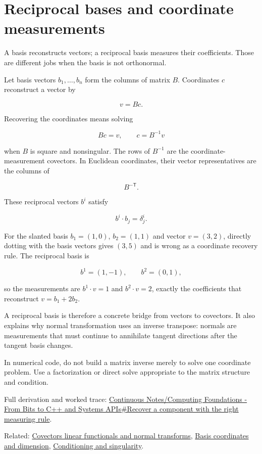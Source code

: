 \hypertarget{appendix-6b3d696dd902}{}
\section{Reciprocal bases and coordinate measurements}\label{appendix-6b3d696dd902-reciprocal-bases-and-coordinate-measurements}

A basis reconstructs vectors; a reciprocal basis measures their coefficients. Those are different jobs when the basis is not orthonormal.

Let basis vectors \(b_1,\ldots,b_n\) form the columns of matrix \(B\). Coordinates \(c\) reconstruct a vector by

\[
v=Bc.
\]

Recovering the coordinates means solving

\[
Bc=v,
\qquad c=B^{-1}v
\]

when \(B\) is square and nonsingular. The rows of \(B^{-1}\) are the coordinate-measurement covectors. In Euclidean coordinates, their vector representatives are the columns of

\[
B^{-\mathsf T}.
\]

These reciprocal vectors \(b^i\) satisfy

\[
b^i\cdot b_j=\delta^i_j.
\]

For the slanted basis \(b_1=(1,0)\), \(b_2=(1,1)\) and vector \(v=(3,2)\), directly dotting with the basis vectors gives \((3,5)\) and is wrong as a coordinate recovery rule. The reciprocal basis is

\[
b^1=(1,-1),\qquad b^2=(0,1),
\]

so the measurements are \(b^1\cdot v=1\) and \(b^2\cdot v=2\), exactly the coefficients that reconstruct \(v=b_1+2b_2\).

A reciprocal basis is therefore a concrete bridge from vectors to covectors. It also explains why normal transformation uses an inverse transpose: normals are measurements that must continue to annihilate tangent directions after the tangent basis changes.

In numerical code, do not build a matrix inverse merely to solve one coordinate problem. Use a factorization or direct solve appropriate to the matrix structure and condition.

Full derivation and worked trace: \hyperref[01-foundations-i-ch017-recover-a-component-with-the-right-measuring-rule]{Continuous Notes/Computing Foundations - From Bits to C++ and Systems APIs\#Recover a component with the right measuring rule}.

Related: \hyperref[appendix-46da295c6787]{Covectors linear functionals and normal transforms}, \hyperref[appendix-ce0341f7ea0d]{Basis coordinates and dimension}, \hyperref[appendix-8f6a01f284a7]{Conditioning and singularity}.
